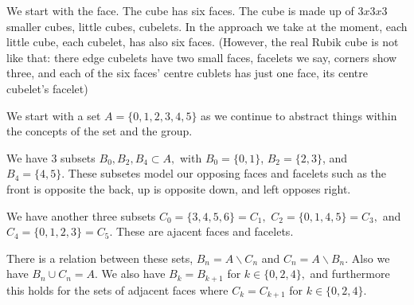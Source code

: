 {%
We start with the face.  The cube has six faces.  The cube is made up of $3x3x3$ smaller
cubes, little cubes, cubelets.  In the approach we take at the moment, each little cube,
each cubelet, has also six faces. (However, the real Rubik cube is not like that: there
edge cubelets have two small faces, facelets we say, corners show three, and each of
the six faces' centre cublets has just one face, its centre cubelet's facelet)

We start with a set $A=\{0,1,2,3,4,5\}$ as we continue to abstract
things within the concepts of the set and the group.

We have $3$ subsets $B_0,B_2,B_4\subset A,$ with $B_0=\{0,1\}$, $B_2=\{2,3\}$, and
$B_4=\{4,5\}.$  These subsetes model our opposing faces and facelets such as
the front is opposite the back, up is opposite down, and left opposes right.

We have another three subsets $C_0=\{3,4,5,6\}=C_1,$ $C_2=\{0,1,4,5\}=C_3,$ and
$C_4=\{0,1,2,3\}=C_5.$ These are ajacent faces and facelets.

There is a relation between these sets, $B_n=A\backslash C_n$ and $C_n=A\backslash B_n.$
Also we have $B_n\cup C_n=A.$  We also have $B_k=B_{k+1}$ for $k\in\{0,2,4\},$ and
furthermore this holds for the sets of adjacent faces where
$C_k=C_{k+1}$ for $k\in\{0,2,4\}.$

}%
\bye

